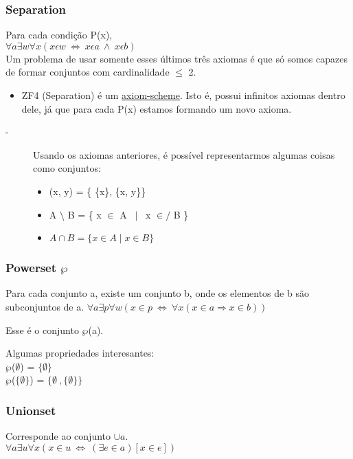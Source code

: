 \documentclass[12pt, a4paper]{article}
\begin{document}
			\subsubsection{Separation}
			\label{sec:separation}
				Para cada condi\c{c}\~ao P(x),\\
				$ \forall a \exists w \forall x (x \epsilon w ~ \Leftrightarrow ~ x \epsilon a ~\wedge~ x \epsilon b )$
				\\
				
				Um problema de usar somente esses \'ultimos tr\^es axiomas \'e que s\'o somos capazes de formar
				conjuntos com cardinalidade $\leq$ 2.
					\begin{itemize}
					\item ZF4 (Separation) \'e um  \underline{axiom-scheme}. Isto \'e, possui infinitos axiomas dentro dele, j\'a que
					para cada P(x) estamos formando um novo axioma.
					\end{itemize} 	
			
			\begin{description}
			\item[-] Usando os axiomas anteriores, \'e poss\'ivel representarmos algumas coisas como conjuntos:
				\begin{itemize}
				\item (x, y) = \{ \{x\}, \{x, y\}\}	\label{teste}
				\item A $\setminus$ B = \{ x $\in$ A ~$\mid$~ x $\in\!\!\!\!\!/$ B \}
				\item $ A \cap B = \{ x \in A \mid x \in B \}$ 
				\end{itemize}
			\end{description}
			
			\subsubsection{Powerset $\wp$}
				Para cada conjunto a, existe um conjunto b, onde os elementos de b s\~ao subconjuntos de a.
				$\forall a \exists p \forall w ( x \in p ~ \Leftrightarrow ~ \forall x (x \in a \Rightarrow x \in b))$

				Esse \'e o conjunto $\wp$(a).
				
				Algumas propriedades interesantes:\\
				$\wp$($\emptyset$) = $\{ \emptyset \}$ \\
				$\wp$($\{ \emptyset \} $) = $\{ \emptyset \ , \{ \emptyset \}\}$

			\subsubsection{Unionset}
				Corresponde ao conjunto $\cup a$.\\
				$\forall a \exists u \forall x ( x \in u ~\Leftrightarrow~ (\exists e \in a) [x \in e] )$
\end{document}
